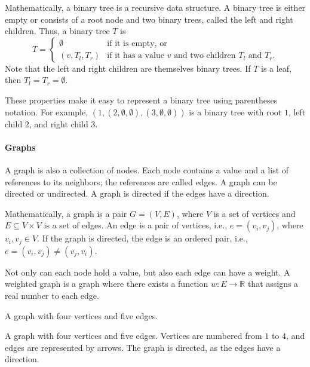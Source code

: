 Mathematically, a binary tree is a recursive data structure.  A binary tree is either
empty or consists of a root node and two binary trees, called the left and right
children.   Thus, a binary tree $T$ is
\[
  T = \begin{cases}
    \emptyset & \text{if it is empty, or} \\
    \left(v, T_l, T_r\right) & \text{if it has a value $v$ and two children $T_l$ and $T_r$.}
  \end{cases}
\]
Note that the left and right children are themselves binary trees.  If $T$ is a leaf,
then $T_l = T_r = \emptyset$.

These properties make it easy to represent a binary tree using parentheses notation.  For
example, $(1, (2, \emptyset, \emptyset), (3, \emptyset, \emptyset))$ is a binary tree
with root $1$, left child $2$, and right child $3$.

\paragraph{Graphs}  A graph is also a collection of nodes.  Each node contains a value and a
list of references to its neighbors; the references are called edges.  A graph can be
directed or undirected.  A graph is directed if the edges have a direction.

Mathematically, a graph is a pair $G = (V, E)$, where $V$ is a set of vertices and $E \subseteq
V \times V$ is a set of edges.  An edge is a pair of vertices, i.e., $e = (v_i, v_j)$,
where $v_i, v_j \in V$. If the graph is directed, the edge is an ordered pair, i.e., $e =
(v_i, v_j) \neq (v_j, v_i)$.

Not only can each node hold a value, but also each edge can have a weight.  A weighted
graph is a graph where there exists a function $w : E \rightarrow \mathbb{R}$ that assigns
a real number to each edge.

\begin{figurebox}[label=fig:graph]{A graph with four vertices and five edges.}
  \centering
  \tcblower
  A graph with four vertices and five edges.  Vertices are numbered from $1$ to $4$, and
  edges are represented by arrows.  The graph is directed, as the edges have a direction.
\end{figurebox}

